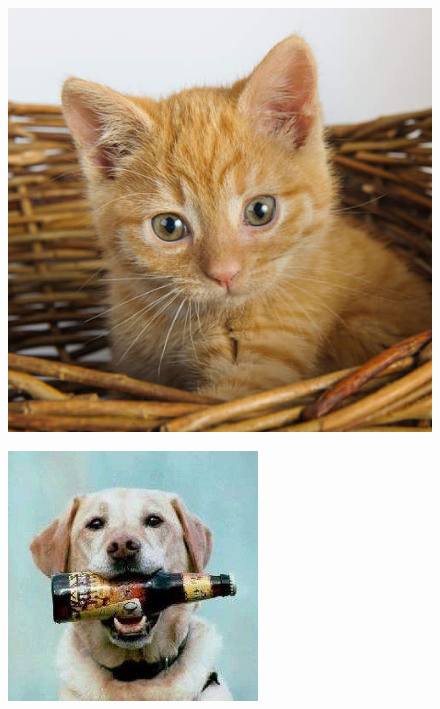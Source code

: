 \begin{figure}
	\centering
	\begin{minipage}{.45\linewidth}
		\includegraphics[width=\linewidth]{sections/pictures/vessel.jpg}
		\label{img1}
	\end{minipage}
	\hspace{.05\linewidth}
	\begin{minipage}{.45\linewidth}
		\includegraphics[width=\linewidth]{sections/pictures/concealed.jpg}

\end{minipage}
\end{figure}
